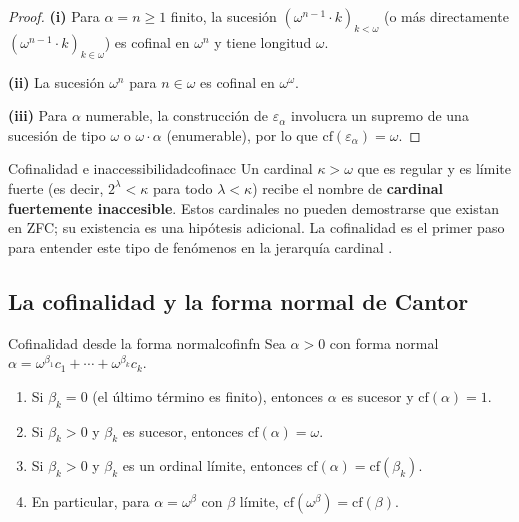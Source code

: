 \begin{proof}
\textbf{(i)} Para $\alpha = n \geq 1$ finito, la sucesión $(\omega^{n-1} \cdot k)_{k < \omega}$ (o más directamente $(\omega^{n-1} \cdot k)_{k \in \omega}$) es cofinal en $\omega^n$ y tiene longitud $\omega$.

\textbf{(ii)} La sucesión $\omega^n$ para $n \in \omega$ es cofinal en $\omega^\omega$.

\textbf{(iii)} Para $\alpha$ numerable, la construcción de $\varepsilon_\alpha$ involucra un supremo de una sucesión de tipo $\omega$ o $\omega \cdot \alpha$ (enumerable), por lo que $\mathrm{cf}(\varepsilon_\alpha) = \omega$.
\end{proof}

\begin{observacion}{Cofinalidad e inaccessibilidad}{cofinacc}
Un cardinal $\kappa > \omega$ que es regular y es límite fuerte (es decir, $2^\lambda < \kappa$ para todo $\lambda < \kappa$) recibe el nombre de \textbf{cardinal fuertemente inaccesible}. Estos cardinales no pueden demostrarse que existan en ZFC; su existencia es una hipótesis adicional. La cofinalidad es el primer paso para entender este tipo de fenómenos en la jerarquía cardinal \cite{kanamori2003, jech2003}.
\end{observacion}

\subsection{La cofinalidad y la forma normal de Cantor}

\begin{proposicion}{Cofinalidad desde la forma normal}{cofinfn}
Sea $\alpha > 0$ con forma normal $\alpha = \omega^{\beta_1} c_1 + \cdots + \omega^{\beta_k} c_k$.
\begin{enumerate}[leftmargin=2em, label=(\roman*)]
  \item Si $\beta_k = 0$ (el último término es finito), entonces $\alpha$ es sucesor y $\mathrm{cf}(\alpha) = 1$.
  \item Si $\beta_k > 0$ y $\beta_k$ es sucesor, entonces $\mathrm{cf}(\alpha) = \omega$.
  \item Si $\beta_k > 0$ y $\beta_k$ es un ordinal límite, entonces $\mathrm{cf}(\alpha) = \mathrm{cf}(\beta_k)$.
  \item En particular, para $\alpha = \omega^\beta$ con $\beta$ límite, $\mathrm{cf}(\omega^\beta) = \mathrm{cf}(\beta)$.
\end{enumerate}
\end{proposicion}

